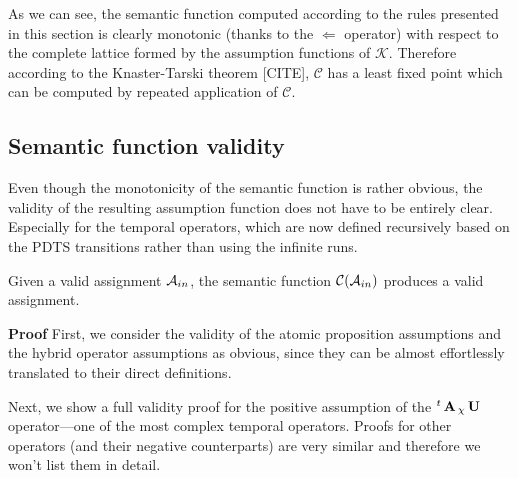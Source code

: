 As we can see, the semantic function computed according to the rules presented in this section is clearly monotonic (thanks to the $\Leftarrow$ operator) with respect to the complete lattice formed by the assumption functions of $\mathcal{K}$. Therefore according to the Knaster-Tarski theorem [CITE], $\mathcal{C}$ has a least fixed point which can be computed by repeated application of $\mathcal{C}$.

\subsection{Semantic function validity}

Even though the monotonicity of the semantic function is rather obvious, the validity of the resulting assumption function does not have to be entirely clear. Especially for the temporal operators, which are now defined recursively based on the \ac{PDTS} transitions rather than using the infinite runs.

\begin{lemma}
	\label{lemma:semantic}
	Given a valid assignment $\mathcal{A}_{in}$, the semantic function $\mathcal{C}(\mathcal{A}_{in})$ produces a valid assignment.
\end{lemma}

\textbf{Proof} First, we consider the validity of the atomic proposition assumptions and the hybrid operator assumptions as obvious, since they can be almost effortlessly translated to their direct definitions.

Next, we show a full validity proof for the positive assumption of the ${}^{t}\operatorname{\mathbf{A}}{}_{\chi}\operatorname{\mathbf{U}}$ operator—one of the most complex temporal operators. Proofs for other operators (and their negative counterparts) are very similar and therefore we won't list them in detail.

